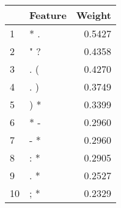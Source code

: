 \begin{tabular}{llr}
\toprule
{} & Feature &  Weight \\
\midrule
1  &     * . &  0.5427 \\
2  &     " ? &  0.4358 \\
3  &     . ( &  0.4270 \\
4  &     . ) &  0.3749 \\
5  &     ) * &  0.3399 \\
6  &     * - &  0.2960 \\
7  &     - * &  0.2960 \\
8  &     : * &  0.2905 \\
9  &     . * &  0.2527 \\
10 &     ; * &  0.2329 \\
\bottomrule
\end{tabular}
